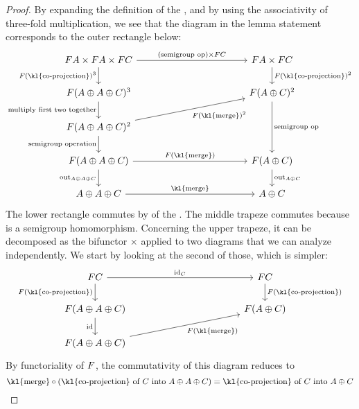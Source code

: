\begin{proof}
    By expanding the definition of the , and by using the associativity of three-fold multiplication, we see that the diagram in the lemma statement corresponds to the outer rectangle below:
    \[\begin{tikzcd}
        [column sep=4cm]
        \functor A\times \functor A \times \functor C
        \ar[d,"\functor(\text{\kl{co-projection}})^3"']
        \ar[r,"(\text{semigroup op}) \times \functor C"]
        &
        \functor A \times \functor C
        \ar[d,"\functor(\text{\kl{co-projection}})^2"]
        \\
        \functor(A \oplus A \oplus C)^3
        \ar[d,"\text{multiply first two together}"']
        &
        \functor(A \oplus C)^2
        \ar[dd,"\text{semigroup op}"]
        \\
        \functor(A \oplus A \oplus C)^2
        \ar[d,"\text{semigroup operation}"']
        \ar[ru,"F(\text{\kl{merge}})^2"']
        \\
        \functor(A \oplus A \oplus C)
        \ar[d, "\outfun_{A \oplus A \oplus C}"']
        \ar[r,"F(\text{\kl{merge}})"]
        &
        \functor(A \oplus C)
        \ar[d, "\outfun_{A\oplus C}"]
        \\ 
        A \oplus A \oplus C
        \ar[r,"\text{\kl{merge}}"]
        &
        A \oplus C
    \end{tikzcd}\]
    The lower rectangle commutes by  of the . The middle trapeze commutes because  is a semigroup homomorphism. Concerning the upper trapeze, it can be decomposed as the bifunctor $\times$ applied to two diagrams that we can analyze independently. We start by looking at the second of those, which is simpler:
    \[\begin{tikzcd}
        [column sep=4cm]
        \functor C
        \ar[d,"\functor(\text{\kl{co-projection}})"']
        \ar[r,"\mathrm{id}_C"]
        &
        \functor C
        \ar[d,"\functor(\text{\kl{co-projection}})"]
        \\
        \functor(A \oplus A \oplus C)
        \ar[d,"\mathrm{id}"']
        &
        \functor(A \oplus C)
        \\
        \functor(A \oplus A \oplus C)
            \ar[ru,"F(\text{\kl{merge}})"']
    \end{tikzcd}\]
    By functoriality of $\functor$, the commutativity of this diagram reduces to
    \[ \text{\kl{merge}} \circ (\text{\kl{co-projection} of}\ C\ \text{into}\ A\oplus A\oplus C) = \text{\kl{co-projection} of}\ C\ \text{into}\ A\oplus C \]

\end{proof}
